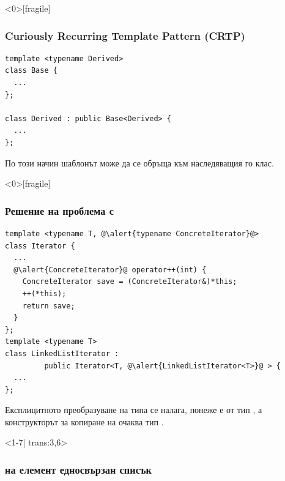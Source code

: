 \documentclass[alsotrans]{beamerswitch}
\def\crtp{0}
\begin{document}
\begin{frame}<\crtp>[fragile]
  \frametitle{Curiously Recurring Template Pattern (CRTP)}

\begin{lstlisting}
template <typename Derived>
class Base {
  ...
};

class Derived : public Base<Derived> {
  ...
};
\end{lstlisting}
  По този начин шаблонът  може да се обръща към наследяващия го клас.
\end{frame}

\begin{frame}<\crtp>[fragile]
  \frametitle{Решение на проблема с }

  \small
\begin{lstlisting}
template <typename T, @\alert{typename ConcreteIterator}@>
class Iterator {
  ...
  @\alert{ConcreteIterator}@ operator++(int) {
    ConcreteIterator save = (ConcreteIterator&)*this;
    ++(*this);
    return save;
  }
};
template <typename T>
class LinkedListIterator :
         public Iterator<T, @\alert{LinkedListIterator<T>}@ > {
  ...
};
\end{lstlisting}
\pause
Експлицитното преобразуване на типа се налага, понеже  е от тип , а конструкторът за копиране на  очаква тип .
\end{frame}

\begin{frame}<1-7| trans:3,6>
  \frametitle{ на елемент  едносвързан списък}

  \begin{center}
  \end{center}
\end{frame}
\end{document}
